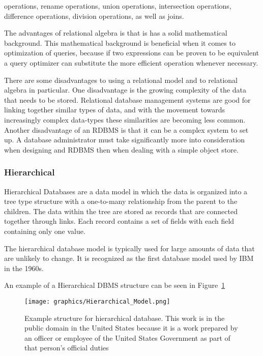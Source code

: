 \documentclass[letterpaper, 11pt]{article}
\begin{document}
operations, rename operations, union operations, intersection operations, difference
operations, division operations, as well as joins.
\par\vspace{\baselineskip}
The advantages of relational algebra is that is has a solid mathematical background.
This mathematical background is beneficial when it comes to optimization of queries,
because if two expressions can be proven to be equivalent a query optimizer can
substitute the more efficient operation whenever necessary.
\par\vspace{\baselineskip}
There are some disadvantages to using a relational model and to relational algebra in
particular. One disadvantage is the growing complexity of the data that needs to be
stored. Relational database management systems are good for linking together similar types
of data, and with the movement towards increasingly complex data-types these similarities
are becoming less common. Another disadvantage of an RDBMS is that it can be a complex
system to set up. A database administrator must take significantly more into consideration
when designing and RDBMS then when dealing with a simple object store.

\subsubsection{Hierarchical}
Hierarchical Databases are a data model in which the data is organized into a tree type
structure with a one-to-many relationship from the parent to the children. The data
within the tree are stored as records that are connected together through links. Each
record contains a set of fields with each field containing only one value.
\par\vspace{\baselineskip}
The hierarchical database model is typically used for large amounts of data that are
unlikely to change. It is recognized as the first database model used by IBM in
the 1960s.\cite{hierarchical_dbms_techopedia}
\par\vspace{\baselineskip}

An example of a Hierarchical DBMS structure can be seen in Figure~\ref{fig:hierarchicalDBMS_structure}
\begin{figure}
  \centering
  \label{fig:hierarchicalDBMS_structure}
  \texttt{[image: graphics/Hierarchical\_Model.png]}
  \caption{Example structure for hierarchical database. This work is in the public domain in the United States because it is a work prepared by an officer or employee of the United States Government as part of that person’s official duties \cite{wikiHierarchicalDBMS}}
\end{figure}
\end{document}
